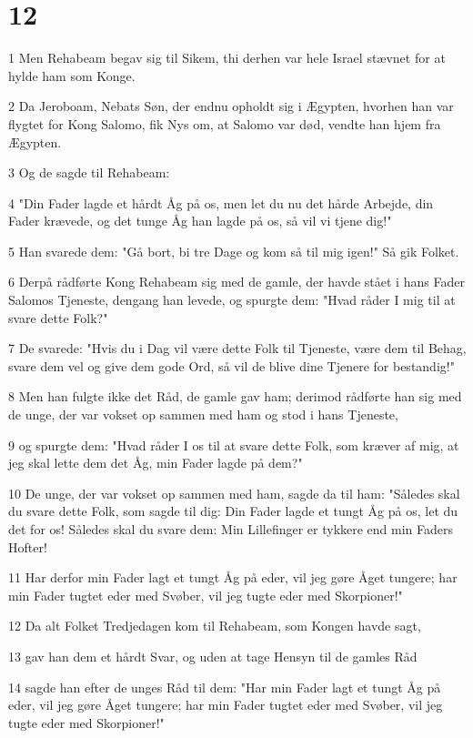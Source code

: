 \chapter{12}

\par 1 Men Rehabeam begav sig til Sikem, thi derhen var hele Israel stævnet for at hylde ham som Konge.
\par 2 Da Jeroboam, Nebats Søn, der endnu opholdt sig i Ægypten, hvorhen han var flygtet for Kong Salomo, fik Nys om, at Salomo var død, vendte han hjem fra Ægypten.
\par 3 Og de sagde til Rehabeam:
\par 4 "Din Fader lagde et hårdt Åg på os, men let du nu det hårde Arbejde, din Fader krævede, og det tunge Åg han lagde på os, så vil vi tjene dig!"
\par 5 Han svarede dem: "Gå bort, bi tre Dage og kom så til mig igen!" Så gik Folket.
\par 6 Derpå rådførte Kong Rehabeam sig med de gamle, der havde stået i hans Fader Salomos Tjeneste, dengang han levede, og spurgte dem: "Hvad råder I mig til at svare dette Folk?"
\par 7 De svarede: "Hvis du i Dag vil være dette Folk til Tjeneste, være dem til Behag, svare dem vel og give dem gode Ord, så vil de blive dine Tjenere for bestandig!"
\par 8 Men han fulgte ikke det Råd, de gamle gav ham; derimod rådførte han sig med de unge, der var vokset op sammen med ham og stod i hans Tjeneste,
\par 9 og spurgte dem: "Hvad råder I os til at svare dette Folk, som kræver af mig, at jeg skal lette dem det Åg, min Fader lagde på dem?"
\par 10 De unge, der var vokset op sammen med ham, sagde da til ham: "Således skal du svare dette Folk, som sagde til dig: Din Fader lagde et tungt Åg på os, let du det for os! Således skal du svare dem: Min Lillefinger er tykkere end min Faders Hofter!
\par 11 Har derfor min Fader lagt et tungt Åg på eder, vil jeg gøre Åget tungere; har min Fader tugtet eder med Svøber, vil jeg tugte eder med Skorpioner!"
\par 12 Da alt Folket Tredjedagen kom til Rehabeam, som Kongen havde sagt,
\par 13 gav han dem et hårdt Svar, og uden at tage Hensyn til de gamles Råd
\par 14 sagde han efter de unges Råd til dem: "Har min Fader lagt et tungt Åg på eder, vil jeg gøre Åget tungere; har min Fader tugtet eder med Svøber, vil jeg tugte eder med Skorpioner!"
